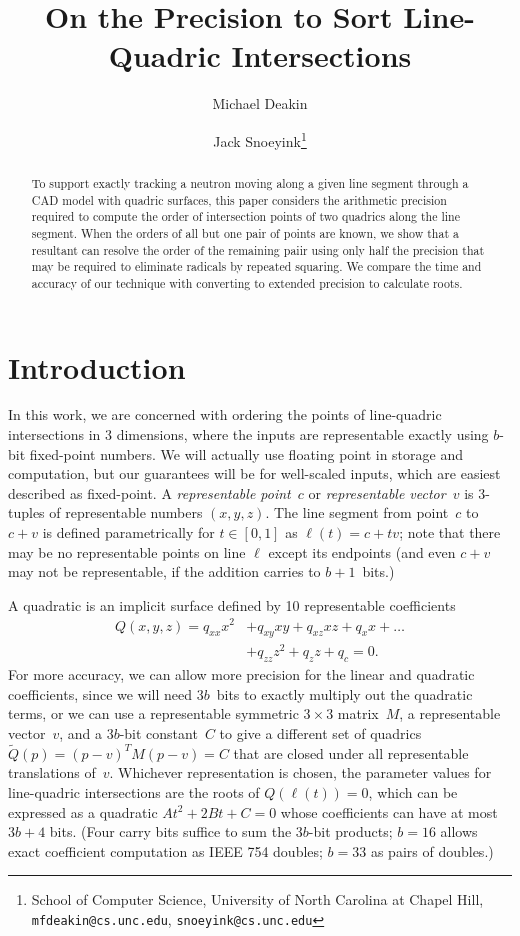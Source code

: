 \documentclass{cccg16}
\title{On the Precision to Sort Line-Quadric Intersections}
\author{Michael Deakin \and Jack Snoeyink\thanks{School of Computer
    Science, University of North Carolina at Chapel Hill, {\tt
      mfdeakin@cs.unc.edu}, {\tt snoeyink@cs.unc.edu}}}
\begin{document}
\thispagestyle{empty}
\maketitle

\begin{abstract}
  To support exactly tracking a neutron
  moving along a given line segment through a CAD model with quadric
  surfaces,  this paper considers the arithmetic precision required
  to compute the order of intersection points of two quadrics along the line segment. When the orders of all but one pair of points are known, we show that a resultant can
  resolve the order of the remaining paiir using only half the precision that may be
  required to eliminate radicals by repeated squaring. We compare
  the time and accuracy of our technique with converting to extended
  precision to calculate roots.
\end{abstract}


\section{Introduction}
In this work, we are concerned with ordering the points of
line-quadric intersections in 3 dimensions, where the inputs are
representable exactly using $b$-bit fixed-point numbers.  We will
actually use floating point in storage and computation, but our
guarantees will be for well-scaled inputs, which are easiest described
as fixed-point.  A {\it representable point}~$c$ or {\it representable
  vector}~$v$ is $3$-tuples of representable numbers $(x, y, z)$. The
line segment from point~$c$ to~$c+v$ is defined parametrically for
$t\in [0,1]$ as $\ell(t)=c+tv$; note that there may be no
representable points on line $\ell$ except its endpoints (and even
$c+v$ may not be representable, if the addition carries to
$b+1$~bits.)

A quadratic is an implicit surface defined by 10 representable coefficients
\begin{align*}Q(x, y, z)=q_{xx} x^2 &+ q_{xy} xy + q_{xz} xz + q_x x + \dots \\
&+ q_{zz} z^2 + q_{z} z + q_c = 0.
\end{align*}
For more accuracy, we can allow more precision for the linear and
quadratic coefficients, since we will need $3b$~bits to exactly
multiply out the quadratic terms, or we can use a representable
symmetric $3\times 3$ matrix~$M$, a representable vector~$v$, and a
$3b$-bit constant~$C$ to give a different set of quadrics $\tilde Q(p)
= (p-v)^TM(p-v) = C$ that are closed under all representable
translations of~$v$. Whichever representation is chosen, the parameter
values for line-quadric intersections are the roots of $Q(\ell(t))=0$,
which can be expressed as a quadratic $At^2+2Bt+C=0$ whose
coefficients can have at most $3b+4$ bits.  (Four carry bits suffice
to sum the $3b$-bit products; $b=16$ allows exact coefficient
computation as IEEE 754 doubles; $b=33$ as pairs of doubles.)
\end{document}
